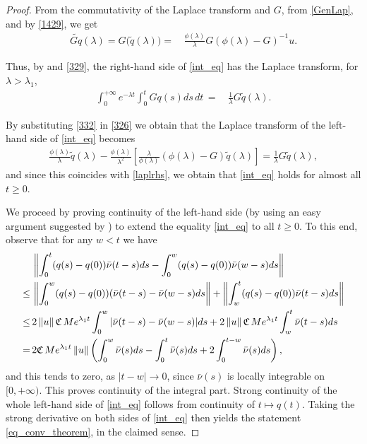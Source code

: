 \documentclass[reqno]{amsart}
\theoremstyle{remark}
\numberwithin{equation}{section} %
\newcommand{\wt}{\widetilde}
\newcommand{\1}{\mathds{1}}
\begin{document}
\begin{proof}
		From the commutativity of the Laplace transform and $G$, from \eqref{GenLap}, and by \eqref{1429}, we get
		\begin{align}
			\wt{Gq}(\lambda)=G\big(\wt q(\lambda)\big)= \, &\frac{\phi(\lambda)}{\lambda} G(\phi(\lambda) - G)^{-1}u.
			\label{329}
		\end{align}
		
		
		Thus, by \cite[Corollary 1.6.5]{arendt2001cauchy} and \eqref{329}, the right-hand side of \eqref{int_eq} has the Laplace transform, {for $\lambda > \lambda_1$,}
		\begin{align}
			\int_0^{+\infty} e^{-\lambda t} \int_0^t Gq(s) ds \, dt \, = \, & \frac{1}{\lambda} G \widetilde{q}(\lambda)  . 
			\label{laplrhs}
		\end{align}
		
		By substituting \eqref{332} in \eqref{326} we obtain that the Laplace transform of the left-hand side of \eqref{int_eq} becomes
		\begin{align}
			\frac{\phi(\lambda)}{\lambda} \widetilde{q}(\lambda) - \frac{\phi (\lambda)}{\lambda^2} \left[ \frac{\lambda}{\phi(\lambda)} (\phi(\lambda) -G) \widetilde{q}(\lambda) \right] = \frac{1}{\lambda} G \widetilde{q}(\lambda),
		\end{align}
		and since this coincides with \eqref{laplrhs}, we obtain that \eqref{int_eq} holds for almost all $t\geq 0$. 
		
		We proceed by proving continuity of the left-hand side (by using an easy argument suggested by \cite{ascione_private}) to extend the equality \eqref{int_eq} to all $t \geq 0$. To this end, observe that for any $w<t$ we have
		\begin{align}
			&  \left\| \int_0^t (q(s)-q(0)) \bar{\nu}(t-s) ds - \int_0^w (q(s)-q(0)) \bar{\nu}(w-s) ds\right\|   \notag \\
			\leq \, & \left\| \int_0^w (q(s)-q(0)) (\bar{\nu}(t-s) - \bar{\nu}(w-s)  ds \right\|  + \left\| \int_w^t (q(s)-q(0)) \bar{\nu}(t-s) ds \right\| \notag \\
			\leq \, &  2 \left\| u \right\|\mathfrak{C}\,Me^{\lambda_1 t} \int_0^w |\bar{\nu}(t-s) - \bar{\nu}(w-s) |  ds   + 2 \left\| u\right\|\mathfrak{C}\,Me^{\lambda_1 t} \int_w^t  \bar{\nu}(t-s) ds \notag \\
			= \, & 2\mathfrak{C}\,Me^{\lambda_1 t}\left\|u \right\| \left( \int_0^w \bar{\nu}(s) ds - \int_{0}^t \bar{\nu} (s) ds + 2 \int_0^{t-w} \bar{\nu}(s) ds  \right),
		\end{align}
		and this tends to zero, as $|t-w|\to0$, since $\bar{\nu}(s)$ is locally integrable on $[0, +\infty)$. This proves continuity of the integral part. Strong continuity of the whole left-hand side of \eqref{int_eq} follows from continuity of $t \mapsto q(t)$. Taking the strong derivative on both sides of \eqref{int_eq} then yields the statement \eqref{eq_conv_theorem}, in the claimed sense.
		

\end{proof}
\end{document}
